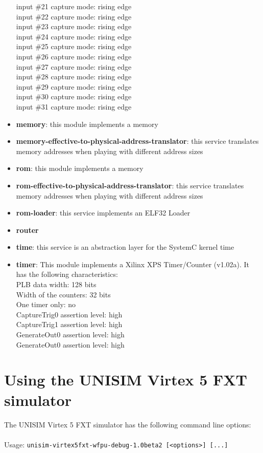 \begin{itemize}
input \#21 capture mode: rising edge\\
input \#22 capture mode: rising edge\\
input \#23 capture mode: rising edge\\
input \#24 capture mode: rising edge\\
input \#25 capture mode: rising edge\\
input \#26 capture mode: rising edge\\
input \#27 capture mode: rising edge\\
input \#28 capture mode: rising edge\\
input \#29 capture mode: rising edge\\
input \#30 capture mode: rising edge\\
input \#31 capture mode: rising edge\\

\item \textbf{memory}: this module implements a memory
\item \textbf{memory-effective-to-physical-address-translator}: this service translates memory addresses when playing with different address sizes
\item \textbf{rom}: this module implements a memory
\item \textbf{rom-effective-to-physical-address-translator}: this service translates memory addresses when playing with different address sizes
\item \textbf{rom-loader}: this service implements an ELF32 Loader
\item \textbf{router}
\item \textbf{time}: this service is an abstraction layer for the SystemC kernel time
\item \textbf{timer}: This module implements a Xilinx XPS Timer/Counter (v1.02a). It has the following characteristics:\\
PLB data width: 128 bits\\
Width of the counters: 32 bits\\
One timer only: no\\
CaptureTrig0 assertion level: high\\
CaptureTrig1 assertion level: high\\
GenerateOut0 assertion level: high\\
GenerateOut0 assertion level: high\\

\end{itemize}
\section{Using the UNISIM Virtex 5 FXT simulator}
\label{UNISIM Virtex 5 FXT_using}
The UNISIM Virtex 5 FXT simulator has the following command line options:\\
~\\
\noindent Usage: \texttt{unisim-virtex5fxt-wfpu-debug-1.0beta2 [<options>] [...]}

